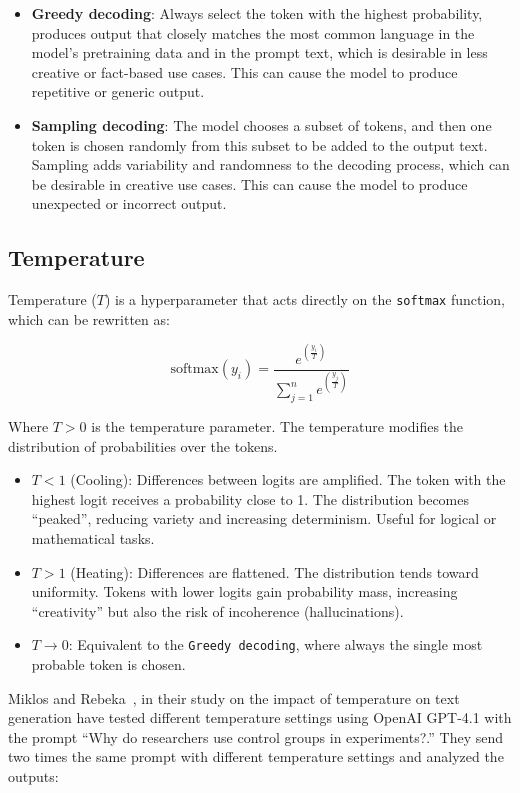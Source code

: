 \begin{itemize}
    \item \textbf{Greedy decoding}: Always select the token with the highest probability, produces output that closely matches 
    the most common language in the model's pretraining data and in the prompt text, which is desirable in less creative or fact-based use cases. 
    This can cause the model to produce repetitive or generic output.
    \item \textbf{Sampling decoding}: The model chooses a subset of tokens, and then one token is chosen randomly from this subset 
    to be added to the output text. Sampling adds variability and randomness to the decoding process, 
    which can be desirable in creative use cases. This can cause the model to produce unexpected or incorrect output.
\end{itemize}

\subsection{Temperature}

Temperature ($T$) is a hyperparameter that acts directly on the \texttt{softmax} function,
which can be rewritten as:

\[ \mathrm{softmax}(y_{i}) = \frac{e^{ (\frac{y_{i}}{T}) }}{\sum_{j=1}^{n}e^{ (\frac{y_{j}}{T}) }} \]

Where $T > 0$ is the temperature parameter. The temperature modifies the distribution of probabilities over the tokens.

\begin{itemize}
    \item $T < 1$ (Cooling): Differences between logits are amplified. The token with the highest logit receives a probability close to 1. 
    The distribution becomes ``peaked'', reducing variety and increasing determinism. Useful for logical or mathematical tasks.
    \item $T > 1$ (Heating): Differences are flattened. The distribution tends toward uniformity. Tokens with lower logits gain probability mass, 
    increasing ``creativity'' but also the risk of incoherence (hallucinations).
    \item $T \to 0$: Equivalent to the \texttt{Greedy decoding}, where always the single most probable token is chosen.
\end{itemize}

Miklos and Rebeka~\cite{site:poltextlabParametersExplained}, in their study on the impact of temperature on text generation have tested different temperature settings
using OpenAI GPT-4.1 with the prompt ``Why do researchers use control groups in experiments?.'' They send two times the same prompt with different temperature settings and analyzed the outputs:


